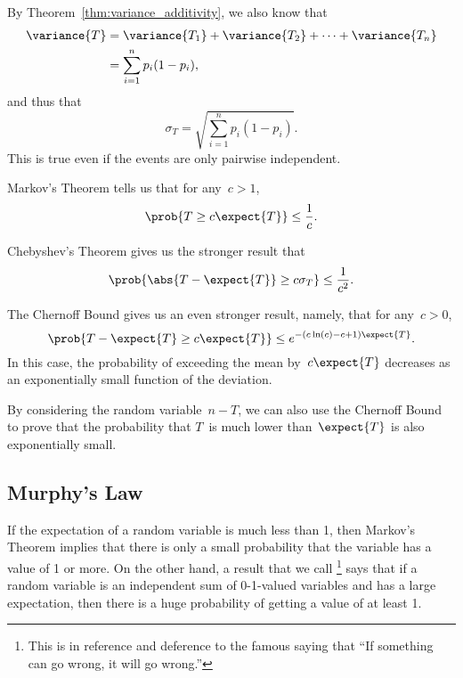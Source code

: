 By Theorem~\ref{thm:variance_additivity}, we also know that
\begin{align*}
\variance{T}
     &= \variance{T_1} + \variance{T_2} + \dots + \variance{T_n} \\
     &= \sum_{i = 1}^n p_i (1 - p_i),
\end{align*}
and thus that
\begin{equation*}
    \sigma_T = \sqrt{ \sum_{i = 1}^n p_i (1 - p_i) }.
\end{equation*}
This is true even if the events are only pairwise independent.

Markov's Theorem tells us that for any~$c > 1$,
\begin{equation*}
    \prob{ T \ge c \expect{T} } \le \frac{1}{c}.
\end{equation*}

Chebyshev's Theorem gives us the stronger result that
\begin{equation*}
    \prob{ \abs{T - \expect{T}} \ge c \sigma_T } \le \frac{1}{c^2}.
\end{equation*}

The Chernoff Bound gives us an even stronger result, namely, that for
any~$c > 0$,
\begin{equation*}
\prob{T - \expect{T} \ge c \expect{T}}
    \le e^{-(c \ln(c) - c + 1) \expect{T}}.
\end{equation*}
In this case, the probability of exceeding the mean by~$c \expect{T}$
decreases as an exponentially small function of the deviation.

By considering the random variable~$n - T$, we can also use the
Chernoff Bound to prove that the probability that $T$~is much lower
than~$\expect{T}$ is also exponentially small.  

\subsection{Murphy's Law}

If the expectation of a random variable is much less than 1, then
Markov's Theorem implies that there is only a small probability that
the variable has a value of 1 or more.  On the other hand, a result
that we call \footnote{This is in reference and
  deference to the famous saying that ``If something can go wrong, it
  will go wrong.''} says that if a random variable is an independent
sum of 0-1-valued variables and has a large expectation, then there is
a huge probability of getting a value of at least 1.

